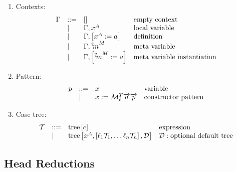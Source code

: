 \begin{enumerate}
    \item Contexts:
        $$
        \begin{array}{lllll} 
            \Gamma
            &::=&
            []
            &\text{empty context}
            \\
            &\mid&
            \Gamma, x^A
            &\text{local variable}
            \\
            &\mid&
            \Gamma, \left[ {x^A := a} \right]
            &\text{definition}
            \\
            &\mid&
            \Gamma, {{}^? \kern-0.2em m}^M
            &\text{meta variable}
            \\
            &\mid&
            \Gamma, \left[ {{{}^? \kern-0.2em m}^M := a} \right]
            &\text{meta variable instantiation}
         \end{array}
        $$

    \item Pattern:
        $$
        \begin{array}{lllll} 
            p &::=& x & \text{variable}
            \\
            &\mid& x := {\cal M}^T_\ell {\overrightarrow {a}} {\overrightarrow {p}}
            & \text{constructor pattern}
         \end{array}
        $$


    \item Case tree:
        $$
        \begin{array}{lllll} 
            {\mathcal T}
            &::=&
            {{\text{tree}}\left[ {e} \right]} & \text{expression}
            \\
            &\mid&
            {{\text{tree}}\left[ {
                x^A,
                \left[ {\ell_1 {{\mathcal T}}_1, \ldots \ell_n {{\mathcal T}}_n} \right],
                {\mathcal D}
            } \right]}
            & {\mathcal D}: \text{optional default tree}
         \end{array}
        $$
\end{enumerate}





\subsection{Head Reductions}

